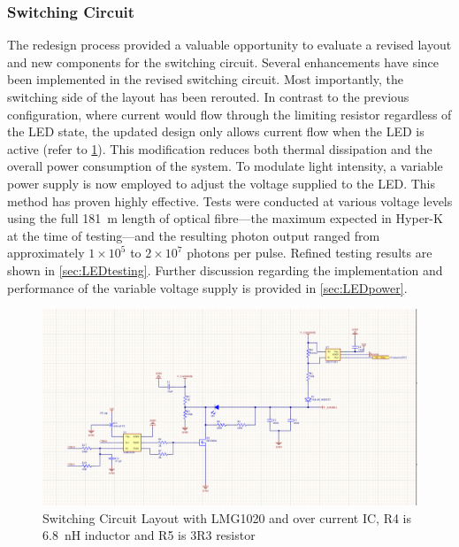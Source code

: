 \documentclass[a4paper,11pt]{article}
\begin{document}



\subsubsection{Switching Circuit}


The redesign process provided a valuable opportunity to evaluate a revised layout and new components for the switching circuit. Several enhancements have since been implemented in the revised switching circuit. Most importantly, the switching side of the layout has been rerouted. In contrast to the previous configuration, where current would flow through the limiting resistor regardless of the LED state, the updated design only allows current flow when the LED is active (refer to \cref{fig:Switching circuit}). This modification reduces both thermal dissipation and the overall power consumption of the system.
To modulate light intensity, a variable power supply is now employed to adjust the voltage supplied to the LED. This method has proven highly effective. Tests were conducted at various voltage levels using the full 181~m length of optical fibre—the maximum expected in Hyper-K at the time of testing—and the resulting photon output ranged from approximately $1\times10^5$ to $2\times10^7$ photons per pulse. Refined testing results are shown in \cref{sec:LEDtesting}.
Further discussion regarding the implementation and performance of the variable voltage supply is provided in \cref{sec:LEDpower}.


\begin{figure}[htbp]
\centering
\includegraphics[scale=0.5]{Switching circuit.png}
\caption{Switching Circuit Layout with LMG1020 and over current IC, R4 is 6.8~nH inductor and R5 is 3R3 resistor\label{fig:Switching circuit}}
\end{figure}
\end{document}

